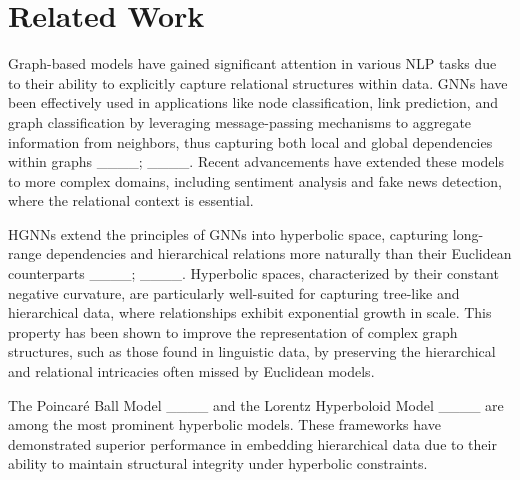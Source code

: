 \section{Related Work}
Graph-based models have gained significant attention in various NLP tasks due to their ability to explicitly capture relational structures within data. GNNs have been effectively used in applications like node classification, link prediction, and graph classification by leveraging message-passing mechanisms to aggregate information from neighbors, thus capturing both local and global dependencies within graphs ____; ____. Recent advancements have extended these models to more complex domains, including sentiment analysis and fake news detection, where the relational context is essential.

HGNNs extend the principles of GNNs into hyperbolic space, capturing long-range dependencies and hierarchical relations more naturally than their Euclidean counterparts ____; ____. Hyperbolic spaces, characterized by their constant negative curvature, are particularly well-suited for capturing tree-like and hierarchical data, where relationships exhibit exponential growth in scale. This property has been shown to improve the representation of complex graph structures, such as those found in linguistic data, by preserving the hierarchical and relational intricacies often missed by Euclidean models.

The Poincaré Ball Model ____ and the Lorentz Hyperboloid Model ____ are among the most prominent hyperbolic models. These frameworks have demonstrated superior performance in embedding hierarchical data due to their ability to maintain structural integrity under hyperbolic constraints. 
